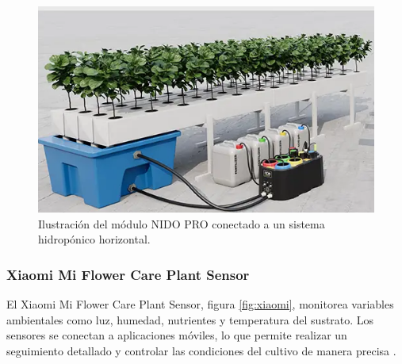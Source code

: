 \begin{figure}[H]
	\centering
	\includegraphics[scale=.55]{./Figures/nido:pro.png}
	\caption{Ilustración del módulo NIDO PRO conectado a un sistema hidropónico horizontal\protect\footnotemark.}
	\label{fig:nido_pro}
\end{figure}





\subsubsection{Xiaomi Mi Flower Care Plant Sensor}
El Xiaomi Mi Flower Care Plant Sensor, figura \ref{fig:xiaomi}, monitorea variables ambientales como luz, humedad, nutrientes y temperatura del sustrato. Los sensores se conectan a aplicaciones móviles, lo que permite realizar un seguimiento detallado y controlar las condiciones del cultivo de manera precisa \cite{XIAOMI}.

